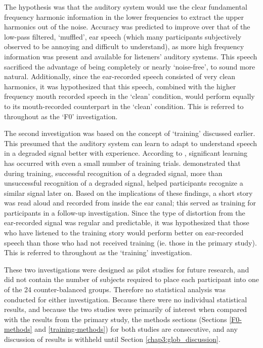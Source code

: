 The hypothesis was that the auditory system would use the clear fundamental frequency harmonic information in the lower frequencies to extract the upper harmonics out of the noise.  Accuracy was predicted to improve over that of the low-pass filtered, `muffled', ear speech (which many participants subjectively observed to be annoying and difficult to understand), as more high frequency information was present and available for listeners' auditory systems.  This speech sacrificed the advantage of being completely or nearly `noise-free', to sound more natural.  Additionally, since the ear-recorded speech consisted of very clean harmonics, it was hypothesized that this speech, combined with the higher frequency mouth recorded speech in the `clean' condition, would perform equally to its mouth-recorded counterpart in the `clean' condition. This is referred to throughout as the `F0' investigation.

The second investigation was based on the concept of `training' discussed earlier.  This presumed that the auditory system can learn to adapt to understand speech in a degraded signal better with experience.  According to \cite{mattys:12}, significant learning has occurred with even a small number of training trials.  \cite{davis:05} demonstrated that during training, successful recognition of a degraded signal, more than unsuccessful recognition of a degraded signal, helped participants recognize a similar signal later on.  
Based on the implications of these findings, a short story was read aloud and recorded from inside the ear canal; this served as training for participants in a follow-up investigation.  Since the type of distortion from the ear-recorded signal was regular and predictable, it was hypothesized that those who have listened to the training story would perform better on ear-recorded speech than those who had not received training (ie. those in the primary study). This is referred to throughout as the `training' investigation.

These two investigations were designed as pilot studies for future research, and did not contain the number of subjects required to place each participant into one of the 24 counter-balanced groups.  Therefore no statistical analysis was conducted for either investigation.  %
Because there were no individual statistical results, and because the two studies were primarily of interest when compared with the results from the primary study, the methods sections (Sections \ref{F0-methods} and \ref{training-methods}) for both studies are consecutive, and any discussion of results is withheld until Section \ref{chap3:glob_discussion}.

